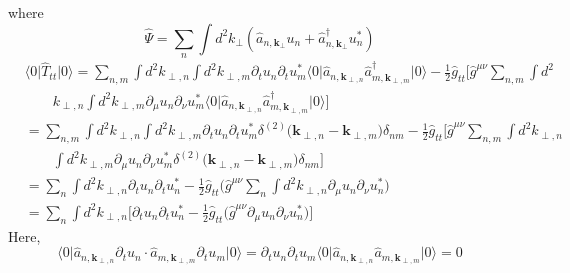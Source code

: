 \documentclass[english]{article}
\begin{document}
 where 
\[
\hat{\Psi}=\sum_{n}\int d^{2}k_{\perp}\left(\hat{a}_{n,\boldsymbol{k}_{\perp}}u_{n}+\hat{a}^{\dagger}_{n,\boldsymbol{k}_{\perp}}u^{*}_{n}\right)
\]
 {}
\begin{align*}
 & \langle0\vert\hat{T}_{tt}\vert0\rangle=\sum_{n,m}\int d^{2}k_{\perp,n}\int d^{2}k_{\perp,m}\partial_{t}u_{n}\partial_{t}u^{*}_{m}\langle0\vert\hat{a}_{n,\boldsymbol{k}_{\perp,n}}\hat{a}^{\dagger}_{m,\boldsymbol{k}_{\perp,m}}\vert0\rangle-\frac{1}{2}\hat{g}_{tt}\biggl[\hat{g}^{\mu\nu}\sum_{n,m}\int d^{2}\\
 & \qquad k_{\perp,n}\int d^{2}k_{\perp,m}\partial_{\mu}u_{n}\partial_{\nu}u^{*}_{m}\langle0\vert\hat{a}_{n,\boldsymbol{k}_{\perp,n}}\hat{a}^{\dagger}_{m,\boldsymbol{k}_{\perp,m}}\vert0\rangle\biggr]\\
 & =\sum_{n,m}\int d^{2}k_{\perp,n}\int d^{2}k_{\perp,m}\partial_{t}u_{n}\partial_{t}u^{*}_{m}\delta^{(2)}\biggl(\boldsymbol{k}_{\perp,n}-\boldsymbol{k}_{\perp,m}\biggr)\delta_{nm}-\frac{1}{2}\hat{g}_{tt}\biggl[\hat{g}^{\mu\nu}\sum_{n,m}\int d^{2}k_{\perp,n}\\
 & \qquad\int d^{2}k_{\perp,m}\partial_{\mu}u_{n}\partial_{\nu}u^{*}_{m}\delta^{(2)}\biggl(\boldsymbol{k}_{\perp,n}-\boldsymbol{k}_{\perp,m}\biggr)\delta_{nm}\biggr]\\
 & =\sum_{n}\int d^{2}k_{\perp,n}\partial_{t}u_{n}\partial_{t}u^{*}_{n}-\frac{1}{2}\hat{g}_{tt}\biggl(\hat{g}^{\mu\nu}\sum_{n}\int d^{2}k_{\perp,n}\partial_{\mu}u_{n}\partial_{\nu}u^{*}_{n}\biggr)\\
 & =\sum_{n}\int d^{2}k_{\perp,n}\biggl[\partial_{t}u_{n}\partial_{t}u^{*}_{n}-\frac{1}{2}\hat{g}_{tt}\biggl(\hat{g}^{\mu\nu}\partial_{\mu}u_{n}\partial_{\nu}u^{*}_{n}\biggr)\biggr]
\end{align*}
 Here, 
\[
\langle0\vert\hat{a}_{n,\boldsymbol{k}_{\perp,n}}\partial_{t}u_{n}\cdot\hat{a}_{m,\boldsymbol{k}_{\perp,m}}\partial_{t}u_{m}\vert0\rangle=\partial_{t}u_{n}\partial_{t}u_{m}\langle0\vert\hat{a}_{n,\boldsymbol{k}_{\perp,n}}\hat{a}_{m,\boldsymbol{k}_{\perp,m}}\vert0\rangle=0
\]
 {}
\end{document}
